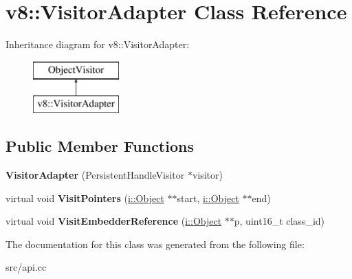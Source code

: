 \hypertarget{classv8_1_1_visitor_adapter}{}\section{v8\+:\+:Visitor\+Adapter Class Reference}
\label{classv8_1_1_visitor_adapter}
Inheritance diagram for v8\+:\+:Visitor\+Adapter\+:\begin{figure}[H]
\begin{center}
\leavevmode
\includegraphics[height=2.000000cm]{classv8_1_1_visitor_adapter}
\end{center}
\end{figure}
\subsection*{Public Member Functions}
\begin{DoxyCompactItemize}
\item 
\hypertarget{classv8_1_1_visitor_adapter_a2025267d0a13561124fe975ae7d44e23}{}{\bfseries Visitor\+Adapter} (Persistent\+Handle\+Visitor $\ast$visitor)\label{classv8_1_1_visitor_adapter_a2025267d0a13561124fe975ae7d44e23}

\item 
\hypertarget{classv8_1_1_visitor_adapter_a0cb80e1b93e36ff0bae73a75f7333416}{}virtual void {\bfseries Visit\+Pointers} (\hyperlink{classv8_1_1internal_1_1_object}{i\+::\+Object} $\ast$$\ast$start, \hyperlink{classv8_1_1internal_1_1_object}{i\+::\+Object} $\ast$$\ast$end)\label{classv8_1_1_visitor_adapter_a0cb80e1b93e36ff0bae73a75f7333416}

\item 
\hypertarget{classv8_1_1_visitor_adapter_a33c38412f32728cec620d650eedd3a99}{}virtual void {\bfseries Visit\+Embedder\+Reference} (\hyperlink{classv8_1_1internal_1_1_object}{i\+::\+Object} $\ast$$\ast$p, uint16\+\_\+t class\+\_\+id)\label{classv8_1_1_visitor_adapter_a33c38412f32728cec620d650eedd3a99}

\end{DoxyCompactItemize}


The documentation for this class was generated from the following file\+:\begin{DoxyCompactItemize}
\item 
src/api.\+cc\end{DoxyCompactItemize}

